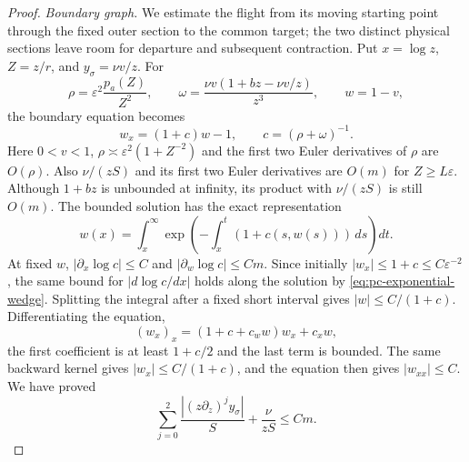 \begin{proof}
\medskip\noindent\textit{Boundary graph.}\quad
We estimate the flight from its moving starting point through the fixed
outer section to the common target; the two distinct physical sections
leave room for departure and subsequent contraction. Put $x=\log z$,
$Z=z/r$, and $y_\sigma=\nu v/z$. For
\[
 \rho=\varepsilon^2\frac{p_a(Z)}{Z^2},\qquad
 \omega=\frac{\nu v(1+bz-\nu v/z)}{z^3},\qquad w=1-v,
\]
the boundary equation becomes
\[
 w_x=(1+c)w-1,\qquad c=(\rho+\omega)^{-1}.
\]
Here $0<v<1$, $\rho\asymp\varepsilon^2(1+Z^{-2})$ and
the first two Euler derivatives of $\rho$ are $O(\rho)$.
Also $\nu/(zS)$ and its first two Euler derivatives are $O(m)$ for
$Z\ge L\varepsilon$. Although $1+bz$ is unbounded at infinity,
its product with $\nu/(zS)$ is still $O(m)$.
The bounded solution has the exact representation
\[
 w(x)=\int_x^\infty
       \exp\left(-\int_x^t(1+c(s,w(s)))\,ds\right)dt.
\]
At fixed $w$, $|\partial_x\log c|\le C$ and
$|\partial_w\log c|\le Cm$. Since initially
$|w_x|\le1+c\le C\varepsilon^{-2}$, the same bound for
$|d\log c/dx|$ holds along the solution by
\eqref{eq:pc-exponential-wedge}. Splitting the integral after a fixed
short interval gives $|w|\le C/(1+c)$. Differentiating the equation,
\[
 (w_x)_x=(1+c+c_ww)w_x+c_xw,
\]
the first coefficient is at least $1+c/2$ and the last term is bounded.
The same backward kernel gives $|w_x|\le C/(1+c)$, and the equation
then gives $|w_{xx}|\le C$. We have proved
\begin{equation}
\label{eq:pc-boundary-euler}
 \sum_{j=0}^2\frac{|(z\partial_z)^jy_\sigma|}{S}
                   +\frac\nu{zS}\le Cm.
\end{equation}


\end{proof}
